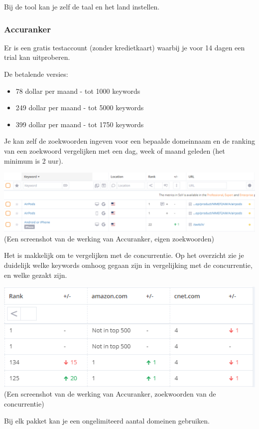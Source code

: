 Bij de tool kan je zelf de taal en het land instellen. 

\subsubsection{Accuranker}
\label{ch: Accuranker}
Er is een gratis testaccount (zonder kredietkaart) waarbij je voor 14 dagen een trial kan uitproberen. 

De betalende versies: 
\begin{itemize}
\item 78 dollar per maand - tot 1000 keywords
\item 249 dollar per maand - tot 5000 keywords
\item 399 dollar per maand - tot 1750 keywords
\end{itemize}

Je kan zelf de zoekwoorden ingeven voor een bepaalde domeinnaam en de ranking van een zoekwoord vergelijken met een dag, week of maand geleden (het minimum is 2 uur). 

\includegraphics[width=\linewidth]{Bachelorproef/bachelor/img/accuranker.PNG}
(Een screenshot van de werking van Accuranker, eigen zoekwoorden)

Het is makkelijk om te vergelijken met de concurrentie. Op het overzicht zie je duidelijk welke keywords omhoog gegaan zijn in vergelijking met de concurrentie, en welke gezakt zijn. 

\includegraphics[width=\linewidth]{Bachelorproef/bachelor/img/accurankercompetitie.PNG}
(Een screenshot van de werking van Accuranker, zoekwoorden van de concurrentie)

Bij elk pakket kan je een ongelimiteerd aantal domeinen gebruiken. 

